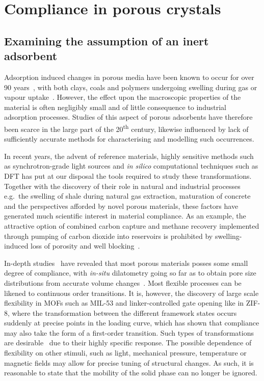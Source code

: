 
\section{Compliance in porous crystals}

\subsection{Examining the assumption of an inert adsorbent}

Adsorption induced changes in porous media have been known
to occur for over 90 years~\cite{mcbainNatureInfluenceHumidity1927},
with both clays, coals and polymers undergoing swelling during gas
or vapour uptake~\cite{gorAdsorptioninducedDeformationNanoporous2017}.
However, the effect upon the macroscopic properties of the material is 
often negligibly small and of little consequence to industrial adsorption
processes. Studies of this aspect of porous adsorbents have therefore
been scarce in the large part of the 20\textsuperscript{th} century,
likewise influenced by lack of sufficiently accurate methods for 
characterising and modelling such occurrences.

In recent years, the advent of reference materials, 
highly sensitive methods such as synchrotron-grade light sources and
\textit{in silico} computational techniques such as DFT has put at
our disposal the tools required to study these transformations. 
Together with the discovery of their role in natural and industrial 
processes e.g.\ the swelling of shale during natural gas extraction,
maturation of concrete and the perspectives afforded by novel porous
materials, these factors have generated much scientific interest
in material compliance. As an example, the attractive option
of combined carbon capture and methane recovery implemented 
through pumping of carbon dioxide into reservoirs is prohibited
by swelling-induced loss of porosity and well 
blocking~\cite{gorAdsorptioninducedDeformationNanoporous2017}. 

In-depth studies~\cite{beringAlterationZeoliteGranule1977} 
have revealed that most porous materials posses some small
degree of compliance, with \textit{in-situ} dilatometry going so far as to 
obtain pore size distributions from accurate volume
changes~\cite{reichenauerExtractingPoreSize2001}. Most flexible 
processes can be likened to continuous order transitions. It is, however,
the discovery of large scale flexibility in MOFs such as 
MIL-53 and linker-controlled gate opening like in ZIF-8, 
where the transformation between the different framework 
states occurs suddenly at precise points in the loading curve,
which has shown that compliance may also take the form of 
a first-order transition. Such types of transformations are
desirable~\cite{kitagawaFunctionalPorousCoordination2004} due to 
their highly specific response. The possible dependence 
of flexibility on other stimuli, such as light, mechanical pressure,
temperature or magnetic fields may allow for precise tuning of 
structural changes. As such, it is reasonable to state that
the mobility of the solid phase can no longer be ignored.

